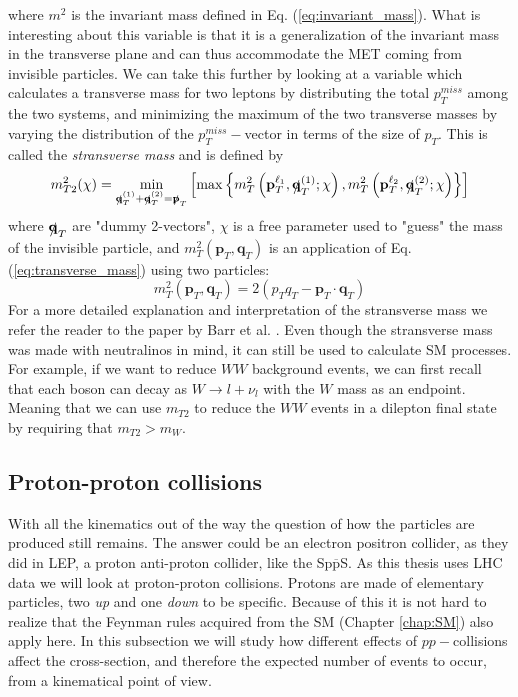 \documentclass[12pt, a4paper]{book}
\begin{document}
where $m^2$ is the invariant mass defined in Eq. (\ref{eq:invariant_mass}). What is interesting about this variable is that it is a generalization of the invariant mass in the transverse plane and can thus accommodate the MET coming from invisible particles.
We can take this further by looking at a variable which calculates a transverse mass for two leptons by distributing the total $p_T^{miss}$ among the two systems, 
and minimizing the maximum of the two transverse masses by varying the distribution of the $p_T^{miss}-$vector in terms of the size of $p_T$. This is called the \textit{stransverse mass} and is defined by
\begin{equation}\label{eq:stransverse_mass}
    m_{T2}^2(\chi) = \underset{\slashed{\mathbf{q}}^{(1)}_T + \slashed{\mathbf{q}}^{(2)}_T = \slashed{\mathbf{p}}_T}{\min}
    \left[\max \left\{m_T^2\left(\mathbf{p}_T^{\ell_1}, \slashed{\mathbf{q}}^{(1)}_T;\chi\right), m_T^2\left(\mathbf{p}_T^{\ell_2}, \slashed{\mathbf{q}}^{(2)}_T;\chi\right) 
    \right\}\right] 
\end{equation}
where $\slashed{\mathbf{q}}_T$ are "dummy 2-vectors", $\chi$ is a free parameter used to "guess" the mass of the invisible particle, and $m_T^2\left(\mathbf{p}_T, \mathbf{q}_T\right)$ is an application of 
Eq. (\ref{eq:transverse_mass}) using two particles:
$$
m_T^2 \left(\mathbf{p}_T, \mathbf{q}_T\right) = 2(p_T q_T - \mathbf{p}_T\cdot\mathbf{q}_T)
$$
For a more detailed explanation and interpretation of the stransverse mass we refer the reader to the paper by Barr et al. \cite{Barr_2003}. Even though the stransverse mass was made with neutralinos in mind, it can still 
be used to calculate SM processes. For example, if we want to reduce $WW$ background events, we can first recall that each boson can decay as $W\rightarrow l+\nu_l$ with the $W$ mass as an endpoint. 
Meaning that we can use $m_{T2}$ to reduce the $WW$ events in a dilepton final state by requiring that $m_{T2} > m_W$.

\subsection{Proton-proton collisions}
With all the kinematics out of the way the question of how the particles are produced still remains. The answer could be an electron positron collider, as they did in LEP, a proton anti-proton collider, like the Sp$\overline{\mbox{p}}$S. As this thesis uses LHC data we will look at proton-proton collisions.
Protons are made of elementary particles, two \textit{up} and one \textit{down} to be specific. Because of this it is not hard to realize that the Feynman rules acquired from the SM (Chapter \ref{chap:SM}) also apply here. In this subsection we will study how different effects of $pp-$collisions affect 
the cross-section, and therefore the expected number of events to occur, from a kinematical point of view.
\end{document}
